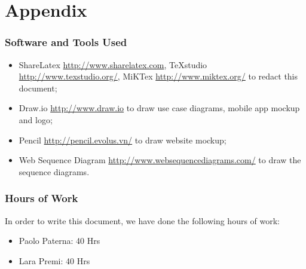 \section{Appendix}
\subsubsection{Software and Tools Used}
	\begin{itemize}
		\item ShareLatex \url{http://www.sharelatex.com}, TeXstudio \url{http://www.texstudio.org/}, MiKTex \url{http://www.miktex.org/} to redact this document;
		\item Draw.io \url{http://www.draw.io} to draw use case diagrams, mobile app mockup and logo;
		\item Pencil \url{http://pencil.evolus.vn/} to draw website mockup;
		\item Web Sequence Diagram \url{http://www.websequencediagrams.com/} to draw the sequence diagrams.
	\end{itemize}
\subsubsection{Hours of Work}
	In order to write this document, we have done the following hours of work:
	\begin{itemize}
		\item Paolo Paterna: 40 Hrs
		\item Lara Premi: 40 Hrs
	\end{itemize}